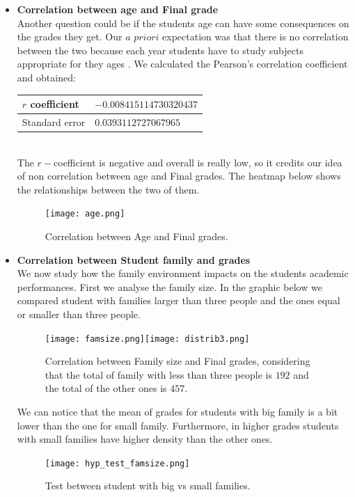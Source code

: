 \documentclass[a4paper, 11pt]{article}
\theoremstyle{definition}
\numberwithin{equation}{section}		%
\numberwithin{table}{section}				%
\begin{document}
\begin{itemize}
\item \textbf{Correlation between age and Final grade}
\\Another question could be if the students age can have some consequences on the grades they get. Our $a$ $priori$ expectation was that there is no correlation between the two because each year students have to study subjects appropriate for they ages . We calculated the Pearson's correlation coefficient and obtained:
\begin{center}
\begin{tabular}{|p{3cm}|p{4cm}|}
\hline
$r$ coefficient & $-0.008415114730320437$ \\
\hline
Standard error & $0.0393112727067965$ \\
\hline
\end{tabular}
\end{center}
\\The $r-$coefficient is negative and overall is really low, so it credits our idea of non correlation between age and Final grades. The heatmap below shows the relationships between the two of them.

\medskip
\medskip
\begin{figure}[h]\centering
\texttt{[image: age.png]}
\caption{Correlation between Age and Final grades.}
\end{figure}


\item \textbf{Correlation between Student family and grades}
\\We now study how the family environment impacts on the students academic performances. First we analyse the family size. In the graphic below we compared student with families larger than three people and the ones equal or smaller than three people.

\begin{figure}[h]\centering
\texttt{[image: famsize.png]}\quad\texttt{[image: distrib3.png]}
\caption{Correlation between Family size and Final grades, considering that the total of family with less than three people is $192$ and the total of the other ones is $457$.}
\end{figure}
We can notice that the mean of grades for students with big family is a bit lower than the one for small family. Furthermore, in higher grades students with small families have higher density than the other ones.

\begin{figure}[h]\centering
\texttt{[image: hyp\_test\_famsize.png]}
\caption{Test between student with big vs  small families.}
\end{figure}


\end{itemize}
\end{document}
